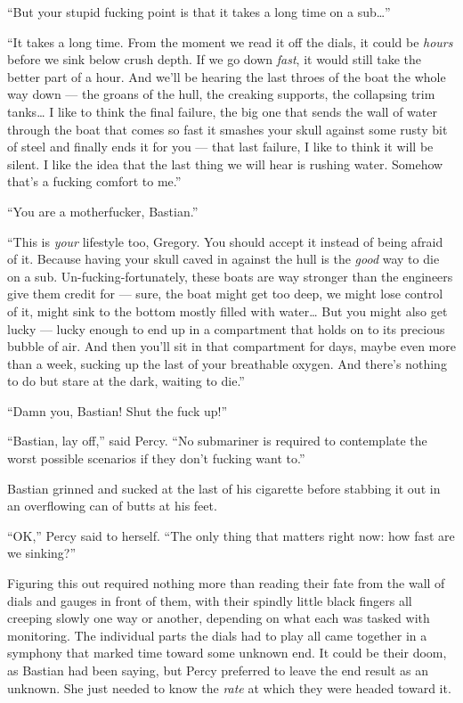 \documentclass[
]{scrbook}
\begin{document}
``But your stupid fucking point is that it takes a long time on a
sub\ldots{}''

``It takes a long time. From the moment we read it off the dials, it
could be \emph{hours} before we sink below crush depth. If we go down
\emph{fast}, it would still take the better part of a hour. And we'll be
hearing the last throes of the boat the whole way down --- the groans of
the hull, the creaking supports, the collapsing trim tanks\ldots{} I
like to think the final failure, the big one that sends the wall of
water through the boat that comes so fast it smashes your skull against
some rusty bit of steel and finally ends it for you --- that last
failure, I like to think it will be silent. I like the idea that the
last thing we will hear is rushing water. Somehow that's a fucking
comfort to me.''

``You are a motherfucker, Bastian.''

``This is \emph{your} lifestyle too, Gregory. You should accept it
instead of being afraid of it. Because having your skull caved in
against the hull is the \emph{good} way to die on a sub.
Un-fucking-fortunately, these boats are way stronger than the engineers
give them credit for --- sure, the boat might get too deep, we might
lose control of it, might sink to the bottom mostly filled with
water\ldots{} But you might also get lucky --- lucky enough to end up in
a compartment that holds on to its precious bubble of air. And then
you'll sit in that compartment for days, maybe even more than a week,
sucking up the last of your breathable oxygen. And there's nothing to do
but stare at the dark, waiting to die.''

``Damn you, Bastian! Shut the fuck up!''

``Bastian, lay off,'' said Percy. ``No submariner is required to
contemplate the worst possible scenarios if they don't fucking want
to.''

Bastian grinned and sucked at the last of his cigarette before stabbing
it out in an overflowing can of butts at his feet.

\bigskip

``OK,'' Percy said to herself. ``The only thing that matters right now:
how fast are we sinking?''

Figuring this out required nothing more than reading their fate from the
wall of dials and gauges in front of them, with their spindly little
black fingers all creeping slowly one way or another, depending on what
each was tasked with monitoring. The individual parts the dials had to
play all came together in a symphony that marked time toward some
unknown end. It could be their doom, as Bastian had been saying, but
Percy preferred to leave the end result as an unknown. She just needed
to know the \emph{rate} at which they were headed toward it.
\end{document}
